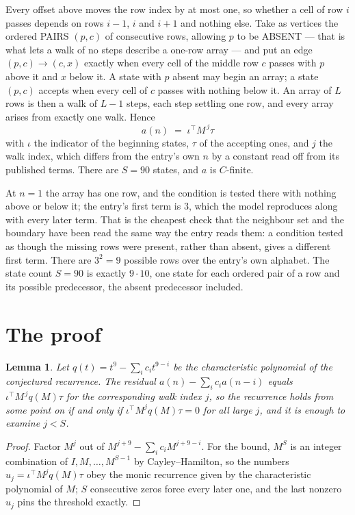 \documentclass[11pt,a4paper]{article}
\theoremstyle{plain}
\newtheorem{lemma}[theorem]{Lemma}
\theoremstyle{definition}
\begin{document}
Every offset above moves the row index by at most one, so whether a cell of row $i$ passes
depends on rows $i-1$, $i$ and $i+1$ and nothing else. Take as vertices the ordered PAIRS
$(p,c)$ of consecutive rows, allowing $p$ to be ABSENT --- that is what lets a walk of no steps
describe a one-row array --- and put an edge $(p,c)\to(c,x)$ exactly when every cell of the
middle row $c$ passes with $p$ above it and $x$ below it. A state with $p$ absent may begin an
array; a state $(p,c)$ accepts when every cell of $c$ passes with nothing below it. An array of
$L$ rows is then a walk of $L-1$ steps, each step settling one row, and every array arises from
exactly one walk. Hence
\[
a(n)\;=\;\iota^{\!\top}M^{\,j}\tau
\]
with $\iota$ the indicator of the beginning states, $\tau$ of the accepting ones, and $j$ the
walk index, which differs from the entry's own $n$ by a constant read off from its published
terms. There are $S=90$ states, and $a$ is $C$-finite.

At $n=1$ the array has one row, and
the condition is tested there with nothing above or below it; the entry's first term is
$3$, which the model reproduces along with every later term. That is the cheapest check
that the neighbour set and the boundary have been read the same way the entry reads them: a
condition tested as though the missing rows were present, rather than absent, gives a different
first term. There are $3^{2}=9$ possible rows over the entry's own alphabet. The state count $S=90$ is exactly $9\cdot10$,
one state for each ordered pair of a row and its possible predecessor, the absent predecessor
included.

\section{The proof}

\begin{lemma}\label{lem:crit}
Let $q(t)=t^{9}-\sum_i c_it^{9-i}$ be the characteristic polynomial of the
conjectured recurrence. The residual $a(n)-\sum_ic_ia(n-i)$ equals
$\iota^{\!\top}M^{\,j}q(M)\tau$ for the corresponding walk index $j$, so the recurrence
holds from some point on if and only if $\iota^{\!\top}M^{j}q(M)\tau=0$ for all large $j$,
and it is enough to examine $j<S$.
\end{lemma}

\begin{proof}
Factor $M^{j}$ out of $M^{j+9}-\sum_ic_iM^{j+9-i}$. For the bound, $M^{S}$
is an integer combination of $I,M,\dots,M^{S-1}$ by Cayley--Hamilton, so the numbers
$u_j=\iota^{\!\top}M^{j}q(M)\tau$ obey the monic recurrence given by the characteristic
polynomial of $M$; $S$ consecutive zeros force every later one, and the last nonzero $u_j$
pins the threshold exactly.
\end{proof}
\end{document}
